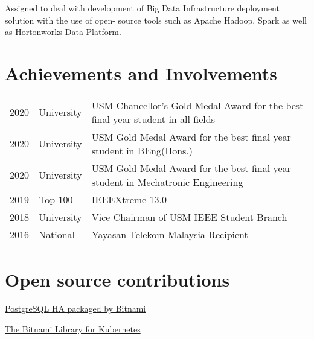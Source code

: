 \documentclass[letterpaper]{deedy-resume} %
\begin{document}
\begin{minipage}[t]{0.66\textwidth}
\sectionspace %


\begin{tightitemize}
\item Assigned to deal with development of Big Data Infrastructure deployment solution with the use of open-
source tools such as Apache Hadoop, Spark as well as Hortonworks Data Platform.
\end{tightitemize}

\sectionspace %

\section{Achievements and Involvements} 

\begin{tabular}{rlp{}}
2020	 & University & USM Chancellor's Gold Medal Award for the best final year student in all fields\\
2020	 & University & USM Gold Medal Award for the best final year student in BEng(Hons.)\\
2020	 & University & USM Gold Medal Award for the best final year student in Mechatronic Engineering\\
2019	 & Top 100 & IEEEXtreme 13.0\\
2018 	 & University & Vice Chairman of USM IEEE Student Branch\\
2016	 & National & Yayasan Telekom Malaysia Recipient\\
\end{tabular}

\sectionspace

\section{Open source contributions} 
\vspace{\topsep}
\begin{tightitemize}
\item \href{https://github.com/bitnami/bitnami-docker-postgresql-repmgr}{PostgreSQL HA packaged by Bitnami} 
\item \href{https://github.com/bitnami/charts}{The Bitnami Library for Kubernetes}
\end{tightitemize}


\end{minipage} %
\end{document}
